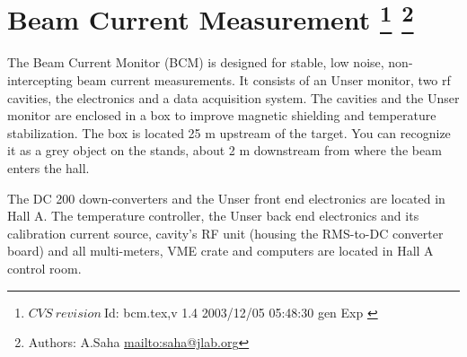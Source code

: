 \section[Beam Current Measurement]{Beam Current Measurement
\footnote{
  $CVS~revision~ $Id: bcm.tex,v 1.4 2003/12/05 05:48:30 gen Exp $ $
}
\footnote{Authors: A.Saha \url{mailto:saha@jlab.org}}
}

The Beam Current Monitor (BCM) is designed for stable, low noise, non-intercepting 
beam current measurements. It consists of an Unser monitor, two rf cavities, 
the electronics and a data acquisition system. The cavities and the Unser monitor 
are enclosed in a box to improve magnetic shielding and temperature stabilization.
The box is located 25 m upstream of the target. You can recognize it as a grey 
object on the stands, about 2 m downstream from where the beam enters the 
hall. 

The DC 200 down-converters and the Unser front end electronics are located in Hall 
A. The temperature controller, the Unser back end electronics and its calibration 
current source, cavity's RF unit (housing the RMS-to-DC converter board) and all 
multi-meters, VME crate and computers are located in Hall A control room.

